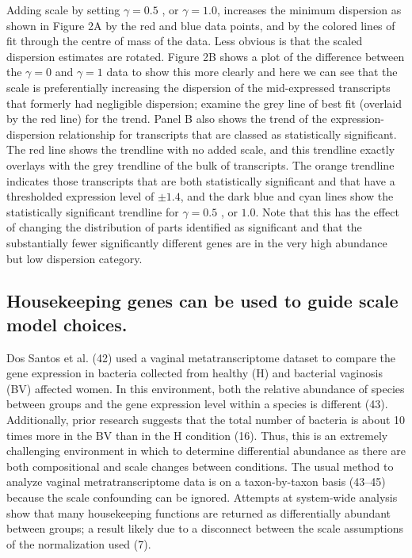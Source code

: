 \documentclass[
]{article}
\begin{document}
Adding scale by setting \(\gamma=0.5\) , or \(\gamma = 1.0\), increases
the minimum dispersion as shown in Figure 2A by the red and blue data
points, and by the colored lines of fit through the centre of mass of
the data. Less obvious is that the scaled dispersion estimates are
rotated. Figure 2B shows a plot of the difference between the
\(\gamma= 0\) and \(\gamma= 1\) data to show this more clearly and here
we can see that the scale is preferentially increasing the dispersion of
the mid-expressed transcripts that formerly had negligible dispersion;
examine the grey line of best fit (overlaid by the red line) for the
trend. Panel B also shows the trend of the expression-dispersion
relationship for transcripts that are classed as statistically
significant. The red line shows the trendline with no added scale, and
this trendline exactly overlays with the grey trendline of the bulk of
transcripts. The orange trendline indicates those transcripts that are
both statistically significant and that have a thresholded expression
level of \(\pm 1.4\), and the dark blue and cyan lines show the
statistically significant trendline for \(\gamma=0.5\) , or \(1.0\).
Note that this has the effect of changing the distribution of parts
identified as significant and that the substantially fewer significantly
different genes are in the very high abundance but low dispersion
category.

\subsection{Housekeeping genes can be used to guide scale model
choices.}\label{housekeeping-genes-can-be-used-to-guide-scale-model-choices.}

Dos Santos et al. (42) used a vaginal metatranscriptome dataset to
compare the gene expression in bacteria collected from healthy (H) and
bacterial vaginosis (BV) affected women. In this environment, both the
relative abundance of species between groups and the gene expression
level within a species is different (43). Additionally, prior research
suggests that the total number of bacteria is about 10 times more in the
BV than in the H condition (16). Thus, this is an extremely challenging
environment in which to determine differential abundance as there are
both compositional and scale changes between conditions. The usual
method to analyze vaginal metratranscriptome data is on a taxon-by-taxon
basis (43--45) because the scale confounding can be ignored. Attempts at
system-wide analysis show that many housekeeping functions are returned
as differentially abundant between groups; a result likely due to a
disconnect between the scale assumptions of the normalization used (7).
\end{document}
